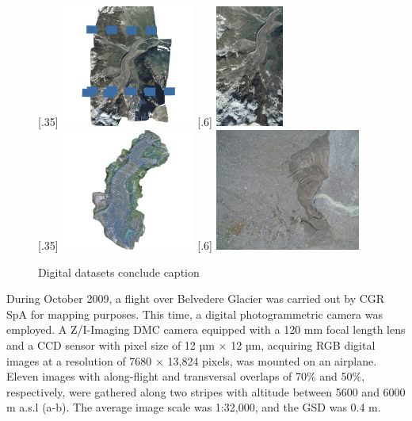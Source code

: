 \begin{figure}
    \centering
    \subcaptionbox{\label{fig:2:datasets_digital:2009_block}}[.35\textwidth]{
        \includegraphics[height=4cm]{2009_block} \hfill
    } 
    \subcaptionbox{\label{fig:2:datasets_digital:2009_img}}[.6\textwidth]{
        \includegraphics[height=4cm]{2009_img}
    } \\
    \subcaptionbox{\label{fig:2:datasets_digital:2019_block}}[.35\textwidth]{
        \includegraphics[height=4cm]{2019_block} \hfill
    } 
    \subcaptionbox{\label{fig:2:datasets_digital:2019_img}}[.6\textwidth]{
        \includegraphics[height=4cm]{2019_img}
    } \\
    \caption{Digital datasets {\color{red} conclude caption}}
    \label{fig:2:datasets_digital}
\end{figure}


During October 2009, a flight over Belvedere Glacier was carried out by CGR SpA
for mapping purposes. This time, a digital photogrammetric camera was employed.
A Z/I-Imaging DMC camera equipped with a 120 mm focal length lens and a CCD
sensor with pixel size of 12 µm × 12 µm, acquiring RGB digital images at a resolution of
7680 × 13,824 pixels, was mounted on an airplane. Eleven images with along-flight and
transversal overlaps of 70\% and 50\%, respectively, were gathered along two stripes with
altitude between 5600 and 6000 m a.s.l (a-b). The average image scale was 1:32,000, and the GSD was 0.4 m.

